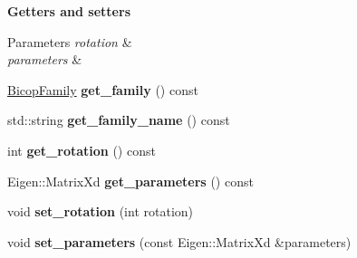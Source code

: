 \begin{Indent}{\bf Getters and setters}\par
{\em 
\begin{DoxyParams}{Parameters}
{\em rotation} & \\
\hline
{\em parameters} & \\
\hline
\end{DoxyParams}
}\begin{DoxyCompactItemize}
\item 
\hyperlink{family_8hpp_a42e95cc06d33896199caab0c11ad44f3}{Bicop\+Family} {\bfseries get\+\_\+family} () const \hypertarget{classvinecopulib_1_1_bicop_a68ab3556ee3bb3d02814fd978573bf3b}{}\label{classvinecopulib_1_1_bicop_a68ab3556ee3bb3d02814fd978573bf3b}

\item 
std\+::string {\bfseries get\+\_\+family\+\_\+name} () const \hypertarget{classvinecopulib_1_1_bicop_a4d4fbc0fdca17564c23f4814d5d2fbe7}{}\label{classvinecopulib_1_1_bicop_a4d4fbc0fdca17564c23f4814d5d2fbe7}

\item 
int {\bfseries get\+\_\+rotation} () const \hypertarget{classvinecopulib_1_1_bicop_ab8e52577a50fbfc57277f9240d8eac03}{}\label{classvinecopulib_1_1_bicop_ab8e52577a50fbfc57277f9240d8eac03}

\item 
Eigen\+::\+Matrix\+Xd {\bfseries get\+\_\+parameters} () const \hypertarget{classvinecopulib_1_1_bicop_a93ab0dd89826e50b209ea3760f251f2f}{}\label{classvinecopulib_1_1_bicop_a93ab0dd89826e50b209ea3760f251f2f}

\item 
void {\bfseries set\+\_\+rotation} (int rotation)\hypertarget{classvinecopulib_1_1_bicop_a4e359624560a089273b25dc74879bd16}{}\label{classvinecopulib_1_1_bicop_a4e359624560a089273b25dc74879bd16}

\item 
void {\bfseries set\+\_\+parameters} (const Eigen\+::\+Matrix\+Xd \&parameters)\hypertarget{classvinecopulib_1_1_bicop_ac8d1d4266b0fd7e2f971d0149f881ef9}{}\label{classvinecopulib_1_1_bicop_ac8d1d4266b0fd7e2f971d0149f881ef9}

\end{DoxyCompactItemize}
\end{Indent}
